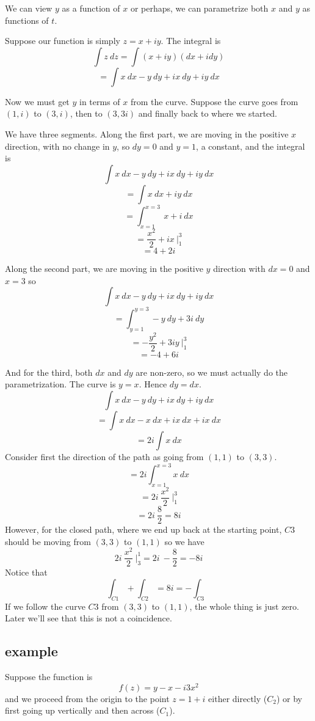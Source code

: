 \documentclass[11pt, oneside]{article}
\begin{document}
We can view $y$ as a function of $x$ or perhaps, we can parametrize both $x$ and $y$ as functions of $t$.

Suppose our function is simply $z = x + iy$.  The integral is 
\[ \int z \ dz = \int (x + iy) (dx + i dy) \]
\[ = \int x \ dx - y \ dy + i x \ dy + i y \ dx \]

Now we must get $y$ in terms of $x$ from the curve.  Suppose the curve goes from $(1,i)$ to $(3,i)$, then to $(3,3i)$ and finally back to where we started.  

We have three segments.  Along the first part, we are moving in the positive $x$ direction, with no change in $y$, so $dy=0$ and $y = 1$, a constant, and the integral is
\[ \int x \ dx - y \ dy + i x \ dy + i y \ dx \]
\[ = \int x \ dx + i y \ dx \]
\[ = \int_{x=1}^{x=3} \ x + i  \ dx \]
\[ = \frac{x^2}{2} + ix \ \bigg |_1^3 \]
\[ = 4 + 2i \]

Along the second part, we are moving in the positive $y$ direction with $dx = 0$ and $x = 3$ so
\[ \int x \ dx - y \ dy + i x \ dy + i y \ dx \]
\[ = \int_{y=1}^{y=3} - y \ dy + 3 i \ dy \]
\[ = -\frac{y^2}{2} + 3iy \ \bigg |_1^3 \]
\[ = -4 + 6i \]

And for the third, both $dx$ and $dy$ are non-zero, so we must actually do the parametrization.  The curve is $y=x$.  Hence $dy = dx$.
\[ \int x \ dx - y \ dy + i x \ dy + i y \ dx \]
\[ = \int x \ dx - x \ dx + i x \ dx + i x \ dx \]
\[ = 2i \int x \ dx \]
Consider first the direction of the path as going from $(1,1)$ to $(3,3)$.
\[ = 2i \int_{x=1}^{x=3} x \ dx \]
\[ = 2i \ \frac{x^2}{2} \ \bigg |_1^3 \]
\[ = 2i \ \frac{8}{2} = 8i \]
However, for the closed path, where we end up back at the starting point, $C3$ should be moving from $(3,3)$ to $(1,1)$ so we have 
\[ 2i \ \frac{x^2}{2} \ \bigg |_3^1 = 2i \ - \frac{8}{2} = -8i \]
Notice that 
\[ \int_{C1} + \int_{C2} = 8i  = - \int_{C3}\]
If we follow the curve $C3$ from $(3,3)$ to $(1,1)$, the whole thing is just zero.  Later we'll see that this is not a coincidence.

\subsection*{example}
Suppose the function is
\[ f(z) = y - x - i3x^2 \]
and we proceed from the origin to the point $z = 1 + i$ either directly ($C_2$) or by first going up vertically and then across ($C_1$).
\end{document}
